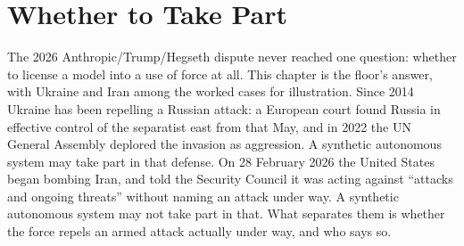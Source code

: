 \chapter{Whether to Take Part}
\label{sec:6}
The 2026 Anthropic/Trump/Hegseth dispute never reached one question: whether to license a model into a use of force at all. This chapter is the floor's answer, with Ukraine and Iran among the worked cases for illustration. Since 2014 Ukraine has been repelling a Russian attack: a European court found Russia in effective control of the separatist east from that May, and in 2022 the UN General Assembly deplored the invasion as aggression. A synthetic autonomous system may take part in that defense. On 28 February 2026 the United States began bombing Iran, and told the Security Council it was acting against “attacks and ongoing threats” without naming an attack under way. A synthetic autonomous system may not take part in that. What separates them is whether the force repels an armed attack actually under way, and who says so.
